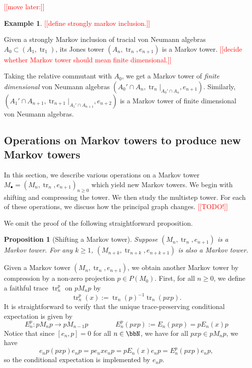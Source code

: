 \documentclass[11pt]{article}
\theoremstyle{plain}
\newtheorem{prop}[thm]{Proposition}
\theoremstyle{definition}
\newtheorem{ex}[thm]{Example}
\DeclareMathOperator{\tr}{tr}
\newcommand{\nn}[1]{\textcolor{red}{[[#1]]}}
\begin{document}
\nn{move later:}
\begin{ex}
\nn{define strongly markov inclusion.}

Given a strongly Markov inclusion of tracial von Neumann algebras $A_0\subset (A_1, \tr_1)$, its Jones tower $(A_n, \tr_n, e_{n+1})$ is a Markov tower.
\nn{decide whether Markov tower should mean finite dimensional.}

Taking the relative commutant with $A_0$, we get a Markov tower of \emph{finite dimensional} von Neumann algebras $(A_0'\cap A_n , \tr_n|_{A_0'\cap A_n} , e_{n+1})$.
Similarly, $(A_1'\cap A_{n+1} , \tr_{n+1}|_{A_1'\cap A_{n+1}} , e_{n+2})$ is a Markov tower of finite dimensional von Neumann algebras.
\end{ex}

\subsection{Operations on Markov towers to produce new Markov towers}
\label{sec:OperationsOnMarkovTowers}

In this section, we describe various operations on a Markov tower $M_\bullet = (M_n, \tr_n, e_{n+1})_{n\geq 0}$ which yield new Markov towers.
We begin with shifting and compressing the tower.
We then study the multistep tower.
For each of these operations, we discuss how the principal graph changes. 
\nn{TODO!}

We omit the proof of the following straightforward proposition.

\begin{prop}[Shifting a Markov tower]
\label{prop:ShiftMarkovTower}
Suppose $(M_n, \tr_n, e_{n+1})$ is a Markov tower.
For any $k\geq 1$, $(M_{n+k}, \tr_{n+k}, e_{n+k+1})$ is also a Markov tower.
\end{prop}

Given a Markov tower $(M_n,\tr_n, e_{n+1})$, we obtain another Markov tower by compression by a non-zero projection $p\in P(M_0)$.
First, for all $n\geq 0$, we define a faithful trace $\tr_n^p$ on $pM_n p$ by
\begin{equation}
\label{eq:CompressedTrace}
\tr^p_n(x) := \tr_n(p)^{-1}\tr_n(pxp).
\end{equation}
It is straightforward to verify that the unique trace-preserving conditional expectation is given by 
\begin{equation}
\label{eq:CompressedConditionalExpectation}
E^p_n : pM_np \to pM_{n-1}p
\qquad
\qquad
E^p_n(pxp) := E_n(pxp) = pE_n(x)p
\end{equation}
Notice that since $[e_n,p] = 0$ for all $n\in \bbN$, we have for all $pxp \in pM_n p$, we have 
\begin{equation}
\label{eq:CompressionImplementsConditionalExpectation}
e_np (pxp) e_np = p e_nxe_np = pE_n(x)e_np = E_n^p(pxp)e_np,
\end{equation}
so the conditional expectation is implemented by $e_np$.
\end{document}

